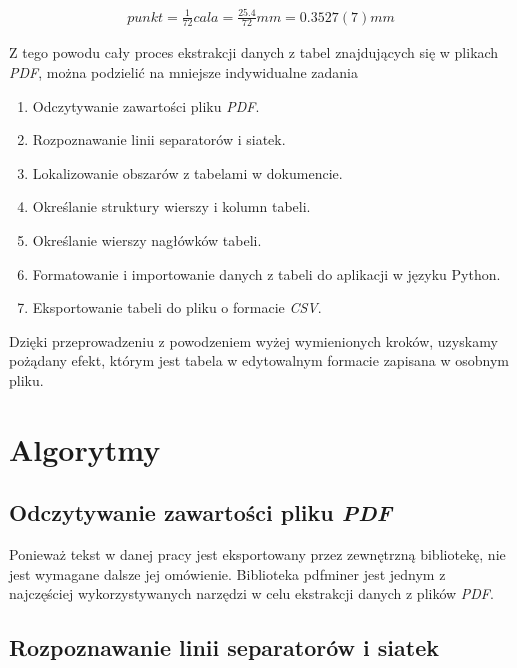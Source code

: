 \documentclass[a4paper,twoside,12pt]{book}
\begin{document}
\begin{align}
punkt = \frac{1}{72} cala = \frac{25.4}{72} mm = 0.3527(7) mm
\end{align}

Z tego powodu cały proces ekstrakcji danych z tabel znajdujących się w plikach \emph{PDF}, można podzielić na mniejsze indywidualne zadania

\begin{enumerate}
\item Odczytywanie zawartości pliku \emph{PDF}.
\item Rozpoznawanie linii separatorów i siatek.
\item Lokalizowanie obszarów z tabelami w dokumencie.
\item Określanie struktury wierszy i kolumn tabeli.
\item Określanie wierszy nagłówków tabeli.
\item Formatowanie i importowanie danych z tabeli do aplikacji w języku Python.
\item Eksportowanie tabeli do pliku o formacie \emph{CSV}.
\end{enumerate}

Dzięki przeprowadzeniu z powodzeniem wyżej wymienionych kroków, uzyskamy pożądany efekt, którym jest tabela w edytowalnym formacie zapisana w osobnym pliku.

\chapter{Algorytmy}

\section{Odczytywanie zawartości pliku \emph{PDF}}

Ponieważ tekst w danej pracy jest eksportowany przez zewnętrzną bibliotekę, nie jest wymagane dalsze jej omówienie. Biblioteka pdfminer jest jednym z najczęściej wykorzystywanych narzędzi w celu ekstrakcji danych z plików \emph{PDF}.

\section{Rozpoznawanie linii separatorów i siatek}
\end{document}
